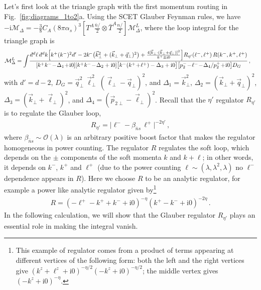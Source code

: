 \documentclass[letterpaper,11pt]{article}
\newcommand{\fig}[1]{Fig.~\ref{fig:#1}}
\newcommand{\abs}[1]{\lvert#1\rvert}
\newcommand{\img}{\mathrm{i}}
\newcommand{\cM}{\mathcal{M}}
\newcommand{\cO}{\mathcal{O}}
\def\bnslash{\bar n\!\!\!\slash}
\def\nslash{n\!\!\!\slash}
\newcommand{\dbar}{d\hspace*{-0.08em}\bar{}\hspace*{0.1em}}
\begin{document}
Let's first look at the triangle graph with the first momentum routing in \fig{diagrams_1to2}a.
Using the SCET Glauber Feynman rules, we have $-\img\cM_\Delta =  -\frac38 C_A (8\pi\alpha_s)^3 [T^A \frac{\bnslash}{2} \otimes \bar T^A \frac{\nslash}{2}] \cM_\Delta^L$, where the loop integral for the triangle graph is
\begin{align}\label{eq:M_Delta}
  &\cM_\Delta^L
%
  =\int\! \frac{\dbar^d\ell\, \dbar^d k 
  \Bigl[
  k^+(k^-)^2d'-2k^{\!-}\bigl(\vec k_\perp^2+(\vec k_\perp+\vec q_\perp)^2\bigr)
  +\frac{4[\vec k_\perp\cdot (\vec k_\perp+\vec q_\perp)]^2}{k^+\pm\img0}
  \Bigr]
  R_{\eta'}(\ell^-,\ell^+)\, R(k^-,k^+,\ell^+)
  }
  {[k^+k^-\!-\!\Delta_1\!+\!\img0]
  [k^+k^-\!-\! \Delta_2+\img0]
  \bigl[k^-(k^+ \!+\! \ell^+)-\Delta_3+\img0\bigr]
  \bigl[p_2^- \!-\! \ell^- \!-\! \Delta_4/p_2^+ \!+\! \img0\bigr]
  D_G
  }
%
  \,,
\end{align}
with $d'=d-2$, 
$D_G=\vec q_\perp^2\,\vec \ell_\perp^2\, (\vec\ell_\perp-\vec q_\perp)^2$, and  $\Delta_1=\vec k_\perp^2$,
$\Delta_2=(\vec k_\perp +\vec q_\perp)^2$,
$\Delta_3=(\vec k_{\perp}+\vec\ell_\perp)^2$,
and $\Delta_4=(\vec p_{2\perp}-\vec\ell_\perp)^2$.
Recall that the $\eta'$ regulator $R_{\eta'}$ is to regulate the Glauber loop,
\begin{align}
  R_{\eta'}=\abs{\ell^--\beta_{\bar ns}\,\ell^+}^{-2\eta'}\,,
\end{align}
where $\beta_{\bar ns}\sim\cO(\lambda)$ is an arbitrary positive boost factor that makes the regulator homogeneous in power counting.
The regulator $R$ regulates the soft loop, which depends on the $\pm$ components of the soft momenta $k$ and $k+\ell$; in other words, it depends on $k^-$, $k^+$ and $\ell^+$ (due to the power counting $\ell\sim  (\lambda,\lambda^2,\lambda)$ no $\ell^-$ dependence appears in $R$).
Here we choose $R$ to be an analytic regulator, for example 
a power like analytic regulator given by\footnote{
  This example of regulator comes from a product of terms appearing at different vertices of the following form: both the left and the right vertices give $(k^z+\ell^z+\img0)^{-\eta/2} (-k^z + \img0)^{-\eta/2}$;
  the middle vertex gives $(-k^z + \img0)^{-\eta}$.
}
\begin{align} \label{eq:Rv2}
  R= (-\ell^+ -k^+ +k^- +\img 0)^{-\eta}  (k^+  - k^-+ \img 0)^{-2\eta} 
  \,.
\end{align}
In the following calculation, we will show that the Glauber regulator $R_{\eta'}$ plays an essential role in making the integral vanish.
\end{document}
